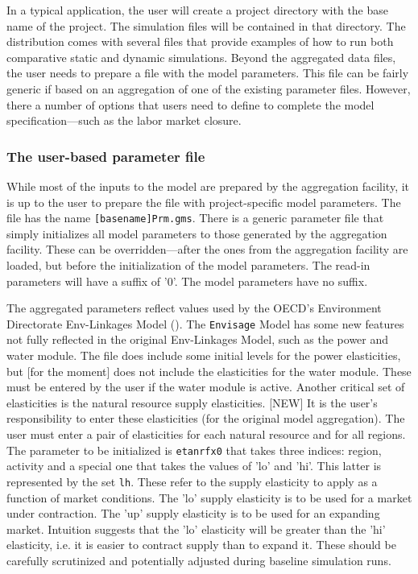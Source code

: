 In a typical application, the user will create a project directory with the base
name of the project. The simulation files will be contained in that directory.
The distribution comes with several files that provide examples of how to run
both comparative static and dynamic simulations. Beyond the aggregated data
files, the user needs to prepare a file with the model parameters. This file can
be fairly generic if based on an aggregation of one of the existing parameter
files. However, there a number of options that users need to define to complete
the model specification---such as the labor market closure.

\subsubsection{The user-based parameter file}

While most of the inputs to the model are prepared by the aggregation facility,
it is up to the user to prepare the file with project-specific model parameters.
The file has the name \texttt{[basename]Prm.gms}. There is a generic parameter
file that simply initializes all model parameters to those generated by the
aggregation facility. These can be overridden---after the ones from the
aggregation facility are loaded, but before the initialization of the model
parameters. The read-in parameters will have a suffix of '0'. The model
parameters have no suffix.

The aggregated parameters reflect values used by the OECD's Environment
Directorate Env-Linkages Model (\cite{ChateauetalOECD2014}). The
\texttt{Envisage} Model has some new features not fully reflected in the
original Env-Linkages Model, such as the power and water module. The file does
include some initial levels for the power elasticities, but [for the moment]
does not include the elasticities for the water module. These must be entered by
the user if the water module is active. Another critical set of elasticities is
the natural resource supply elasticities. [NEW] It is the user's responsibility
to enter these elasticities (for the original model aggregation). The user must
enter a pair of elasticities for each natural resource and for all regions. The
parameter to be initialized is \texttt{etanrfx0} that takes three indices:
region, activity and a special one that takes the values of 'lo' and 'hi'. This
latter is represented by the set \texttt{lh}. These refer to the supply
elasticity to apply as a function of market conditions. The 'lo' supply
elasticity is to be used for a market under contraction. The 'up' supply
elasticity is to be used for an expanding market. Intuition suggests that the
'lo' elasticity will be greater than the 'hi' elasticity, i.e. it is easier to
contract supply than to expand it. These should be carefully scrutinized and
potentially adjusted during baseline simulation runs.

